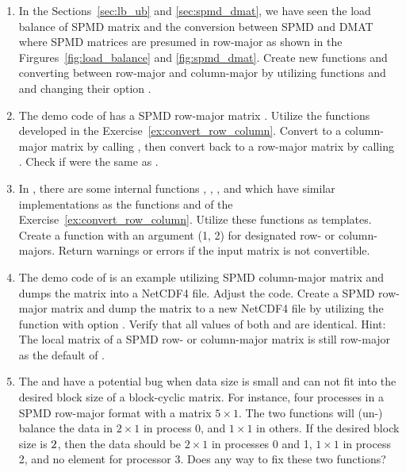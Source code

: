 \begin{enumerate}[label=\thechapter-\arabic*]
\item
\label{ex:convert_row_column}
In the Sections~\ref{sec:lb_ub} and \ref{sec:spmd_dmat},
we have seen the load balance of SPMD matrix
and the conversion between SPMD and DMAT where SPMD matrices 
are presumed in row-major as shown in
the Firgures~\ref{fig:load_balance} and \ref{fig:spmd_dmat}.
Create new functions
 and  converting between
row-major and column-major by utilizing functions 
and  and changing their option .

\item
The demo code  of  has a SPMD row-major
matrix . Utilize the functions developed in the
Exercise~\ref{ex:convert_row_column}.
Convert  to a column-major matrix 
by calling , then convert  back to a
row-major matrix  by calling .
Check if  were the same as .

\item
In , there are some internal functions ,
, , and
 which have similar implementations as the
functions  and  of the
Exercise~\ref{ex:convert_row_column}. Utilize these functions as templates.
Create a function  with an argument  (1, 2)
for designated row- or column-majors.
Return warnings or errors if the input matrix is not convertible.

\item
\label{ex:nc4_spmdr}
The demo code  of  is an example utilizing
SPMD column-major matrix  and dumps the matrix into a NetCDF4
file. Adjust the code. Create a SPMD row-major matrix  and dump
the matrix to a new NetCDF4 file  by utilizing the function
 with option . Verify that all
 values of both  and 
are identical.
{\color{blue}Hint:
The local matrix of a SPMD row- or column-major matrix is still
row-major as the default of .
}

\item
The  and  have a potential bug
when data size is small and can not fit into the desired block size of
a block-cyclic matrix. For instance, four processes in
a SPMD row-major format with a matrix $5\times 1$. The two functions will
(un-) balance the data in $2\times 1$ in process 0, and $1\times 1$ in others.
If the desired block size is $2\time 1$, then the data should be
$2\times 1$ in processes 0 and 1, $1\times 1$ in process 2, and no
element for processor 3. Does any way to fix these two functions?

\end{enumerate}

